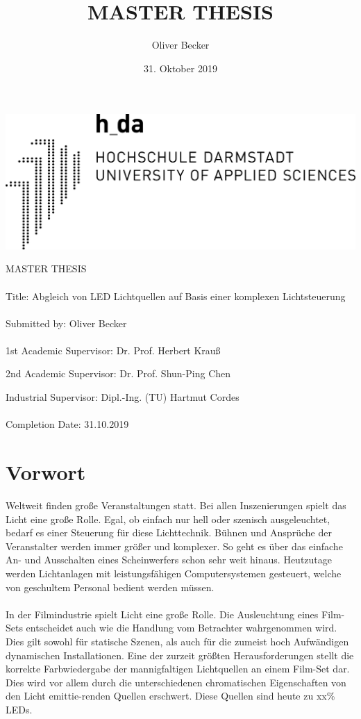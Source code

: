 \documentclass{scrartcl}
\title{MASTER THESIS}
\author{Oliver Becker}
\date{31. Oktober 2019} %
\begin{document}
\begin{center}
    \center\includegraphics[width=0.4\linewidth]{logo.png}

    MASTER THESIS
\end{center}
\paragraph{}
Title:  Abgleich von LED Lichtquellen auf Basis einer komplexen Lichtsteuerung
\paragraph{}
Submitted by:   Oliver Becker
\paragraph{}
1st Academic Supervisor:    Dr. Prof. Herbert Krauß

2nd Academic Supervisor:    Dr. Prof. Shun-Ping Chen

Industrial Supervisor:      Dipl.-Ing. (TU) Hartmut Cordes
\paragraph{}
Completion Date:    31.10.2019
\clearpage

\tableofcontents
\clearpage

\section{Vorwort}
Weltweit finden große Veranstaltungen statt. Bei allen Inszenierungen spielt das Licht eine große Rolle. Egal, ob einfach nur hell oder szenisch ausgeleuchtet, bedarf es einer Steuerung für diese Lichttechnik. Bühnen und Ansprüche der Veranstalter werden immer größer und komplexer. So geht es über das einfache An- und Ausschalten eines Scheinwerfers schon sehr weit hinaus. Heutzutage werden Lichtanlagen mit leistungsfähigen Computersystemen gesteuert, welche von geschultem Personal bedient werden müssen.
\paragraph{}
In der Filmindustrie spielt Licht eine große Rolle. Die Ausleuchtung eines Film-Sets entscheidet auch wie die Handlung vom Betrachter wahrgenommen wird. Dies gilt sowohl für statische Szenen, als auch für die zumeist hoch Aufwändigen dynamischen Installationen.
Eine der zurzeit größten Herausforderungen stellt die korrekte Farbwiedergabe der mannigfaltigen Lichtquellen an einem Film-Set dar.
Dies wird vor allem durch die unterschiedenen chromatischen Eigenschaften von den Licht emittie-renden Quellen erschwert. Diese Quellen sind heute zu xx\% LEDs.
\end{document}
